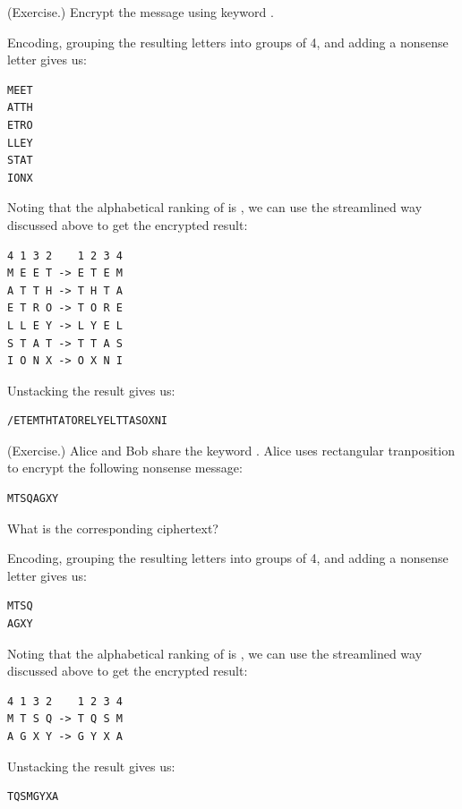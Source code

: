 \documentclass[letterpaper]{article}
\newcommand{\0}{\mathbf{0}}
\begin{document}
\begin{mdframed}
    (Exercise.) Encrypt the message  using keyword .

    \begin{mdframed}
        Encoding, grouping the resulting letters into groups of 4, and adding a nonsense letter gives us: 
        \begin{verbatim}
MEET
ATTH
ETRO
LLEY
STAT
IONX\end{verbatim}
        Noting that the alphabetical ranking of  is , we can use the streamlined way discussed above to get the encrypted result:
        \begin{mdframed}
            \begin{verbatim}
4 1 3 2    1 2 3 4
M E E T -> E T E M
A T T H -> T H T A
E T R O -> T O R E
L L E Y -> L Y E L
S T A T -> T T A S
I O N X -> O X N I\end{verbatim}
        \end{mdframed}
        Unstacking the result gives us:
        \begin{mdframed}
            \begin{verbatim}
/ETEMTHTATORELYELTTASOXNI\end{verbatim}
        \end{mdframed}
    \end{mdframed}
\end{mdframed}

\begin{mdframed}
    (Exercise.) Alice and Bob share the keyword . Alice uses rectangular tranposition to encrypt the following nonsense message: 
    \begin{verbatim}
MTSQAGXY\end{verbatim}
    What is the corresponding ciphertext? 
    \begin{mdframed}
        Encoding, grouping the resulting letters into groups of 4, and adding a nonsense letter gives us: 
        \begin{mdframed}
            \begin{verbatim}
MTSQ
AGXY\end{verbatim}
        \end{mdframed}
        Noting that the alphabetical ranking of  is , we can use the streamlined way discussed above to get the encrypted result:
        \begin{mdframed}
            \begin{verbatim}
4 1 3 2    1 2 3 4
M T S Q -> T Q S M
A G X Y -> G Y X A\end{verbatim}
        \end{mdframed}
        Unstacking the result gives us:
        \begin{mdframed}
            \begin{verbatim}
TQSMGYXA\end{verbatim}
    \end{mdframed}
    \end{mdframed}
\end{mdframed}
\end{document}
